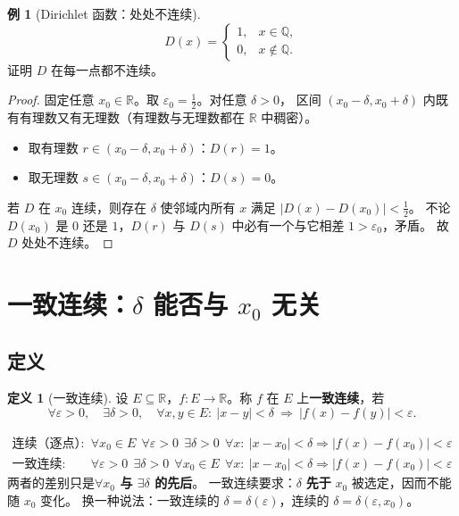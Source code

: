 \documentclass[11pt,a4paper]{ctexart}
\theoremstyle{definition}
\newtheorem{example}[theorem]{例}
\newtheorem{definition}[theorem]{定义}
\theoremstyle{remark}
\newcommand{\R}{\mathbb{R}}
\newcommand{\Q}{\mathbb{Q}}
\newcommand{\eps}{\varepsilon}
\newcommand{\abs}[1]{\left\lvert #1 \right\rvert}
\begin{document}
\begin{example}[Dirichlet 函数：处处不连续]\label{ex:dirichlet}
\[
  D(x)=\begin{cases}1,& x\in\Q,\\ 0,& x\notin\Q.\end{cases}
\]
证明 $D$ 在每一点都不连续。
\end{example}

\begin{proof}
固定任意 $x_0\in\R$。取 $\eps_0=\frac12$。对任意 $\delta>0$，
区间 $(x_0-\delta,x_0+\delta)$ 内既有有理数又有无理数（有理数与无理数都在 $\R$ 中稠密）。
\begin{itemize}
  \item 取有理数 $r\in(x_0-\delta,x_0+\delta)$：$D(r)=1$。
  \item 取无理数 $s\in(x_0-\delta,x_0+\delta)$：$D(s)=0$。
\end{itemize}
若 $D$ 在 $x_0$ 连续，则存在 $\delta$ 使邻域内所有 $x$ 满足 $\abs{D(x)-D(x_0)}<\frac12$。
不论 $D(x_0)$ 是 $0$ 还是 $1$，$D(r)$ 与 $D(s)$ 中必有一个与它相差 $1>\eps_0$，矛盾。
故 $D$ 处处不连续。

\end{proof}

\newpage

\section{一致连续：$\delta$ 能否与 $x_0$ 无关}

\subsection{定义}

\begin{definition}[一致连续]\label{def:unif}
设 $E\subseteq\R$，$f:E\to\R$。称 $f$ 在 $E$ 上\textbf{一致连续}，若
\begin{equation}\label{eq:unif}
  \forall\eps>0,\quad \exists\delta>0,\quad \forall x,y\in E:\ \abs{x-y}<\delta
  \ \Rightarrow\ \abs{f(x)-f(y)}<\eps .
\end{equation}
\end{definition}

\begin{keybox}
\[
  \begin{aligned}
    \text{连续（逐点）}:\quad& \forall x_0\in E\ \ \forall\eps>0\ \ \exists\delta>0\ \ \forall x:\ \abs{x-x_0}<\delta\Rightarrow\abs{f(x)-f(x_0)}<\eps\\
    \text{一致连续}:\quad& \forall\eps>0\ \ \exists\delta>0\ \ \forall x_0\in E\ \ \forall x:\ \abs{x-x_0}<\delta\Rightarrow\abs{f(x)-f(x_0)}<\eps
  \end{aligned}
\]
两者的差别只是\textbf{$\forall x_0$ 与 $\exists\delta$ 的先后}。
一致连续要求：$\delta$ \textbf{先于} $x_0$ 被选定，因而不能随 $x_0$ 变化。
换一种说法：一致连续的 $\delta=\delta(\eps)$，连续的 $\delta=\delta(\eps,x_0)$。
\end{keybox}
\end{document}
